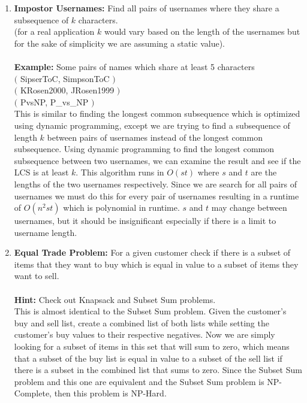 \documentclass[12pt]{elsart}
\begin{document}
\begin{enumerate}
  \item {\bf Impostor Usernames:} Find all pairs of usernames where they share a subsequence of $k$ characters.\\

 (for a real application $k$ would vary based on the length of the usernames but for the sake of simplicity we are assuming a static value). \\\\
{\bf Example:} Some pairs of names which share at least 5 characters\\
$($ SipserToC, SimpsonToC $)$\\
$($ KRosen2000, JRosen1999 $)$\\
$($ PvsNP, P\_vs\_NP $)$\\
  This is similar to finding the longest common subsequence which is optimized using dynamic programming, except we are trying to find a subsequence of length $k$ between pairs of usernames instead of the longest common subsequence. Using dynamic programming to find the longest common subsequence between two usernames, we can examine the result and see if the LCS is at least $k$. This algorithm runs in $O(st)$ where $s$ and $t$ are the lengths of the two usernames respectively. Since we are search for all pairs of usernames we must do this for every pair of usernames resulting in a runtime of $O(n^2st)$ which is polynomial in runtime. $s$ and $t$ may change between usernames, but it should be insignificant especially if there is a limit to username length.
  
  \newpage

  \item {\bf Equal Trade Problem:} For a given customer check if there is a subset of items that they want to buy which is equal in value to a subset of items they want to sell. \\\\
{\bf Hint: } Check out Knapsack and Subset Sum problems.\\
  This is almost identical to the Subset Sum problem. Given the customer's buy and sell list, create a combined list of both lists while setting the customer's buy values to their respective negatives. Now we are simply looking for a subset of items in this set that will sum to zero, which means that a subset of the buy list is equal in value to a subset of the sell list if there is a subset in the combined list that sums to zero. Since the Subset Sum problem and this one are equivalent and the Subset Sum problem is NP-Complete, then this problem is NP-Hard.


\end{enumerate}
\end{document}
